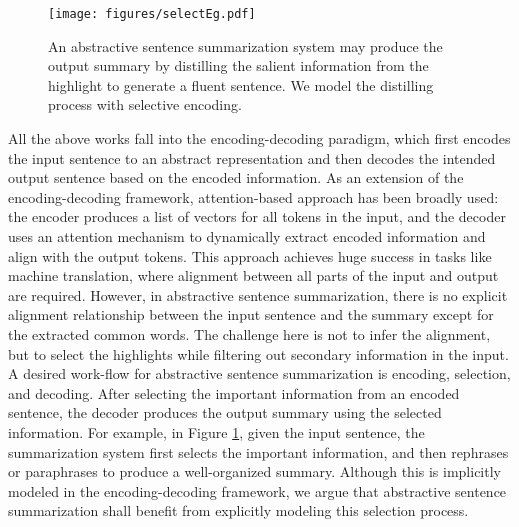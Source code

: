 \documentclass[11pt,a4paper]{article}
\begin{document}
\begin{figure}[ht]
	\centering
	\texttt{[image: figures/selectEg.pdf]}
	\caption{\label{fig:select}An abstractive sentence summarization system may produce the output summary by distilling the salient information from the highlight to generate a fluent sentence. We model the distilling process with selective encoding.
	}
\end{figure}



All the above works fall into the encoding-decoding paradigm, which first encodes the input sentence to an abstract representation and then decodes the intended output sentence based on the encoded information.
As an extension of the encoding-decoding framework, attention-based approach \citep{bahdanau2014neural} has been broadly used: the encoder produces a list of vectors for all tokens in the input, and the decoder uses an attention mechanism to dynamically extract encoded information and align with the output tokens.
This approach achieves huge success in tasks like machine translation, where alignment between all parts of the input and output are required.
However, in abstractive sentence summarization, there is no explicit alignment relationship between the input sentence and the summary except for the extracted common words.
The challenge here is not to infer the alignment, but to select the highlights while filtering out secondary information in the input.
A desired work-flow for abstractive sentence summarization is encoding, selection, and decoding.
After selecting the important information from an encoded sentence, the decoder produces the output summary using the selected information.
For example, in Figure \ref{fig:select}, given the input sentence, the summarization system first selects the important information, and then rephrases or paraphrases to produce a well-organized summary.
Although this is implicitly modeled in the encoding-decoding framework, we argue that abstractive sentence summarization shall benefit from explicitly modeling this selection process.
\end{document}
